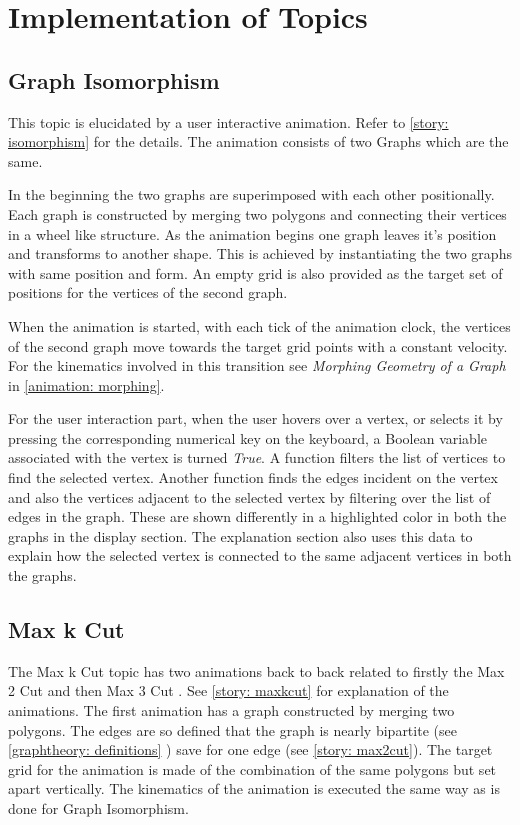 \section{Implementation of Topics}

\subsection{Graph Isomorphism}
\label{impl: isomporphism}

This topic is elucidated by a user interactive animation. Refer to
\autoref{story: isomorphism} for the details. The animation consists of two
Graphs which are the same. 

In the beginning the two graphs are superimposed with each other positionally.
Each graph is constructed by merging two polygons and connecting their vertices
in a wheel like structure.
As the animation begins one graph leaves it's position and transforms to
another shape.  This is achieved by instantiating the two graphs with same
position and form. An empty grid is also provided as the target set of
positions for the vertices of the second graph. 

When the animation is started, with each tick of the animation clock, the
vertices of the second graph move towards the target grid points with a
constant velocity. For the kinematics involved in this transition see
\emph{Morphing Geometry of a Graph} in \autoref{animation: morphing}.

For the user interaction part, when the user hovers over a vertex, or selects
it by pressing the corresponding numerical key on the keyboard, a Boolean
variable associated with the vertex is turned \emph{True}. A function filters
the list of vertices to find the selected vertex. Another function finds the
edges incident on the vertex and also the vertices adjacent to the selected
vertex by filtering over the list of edges in the graph. These are shown
differently in a highlighted color in both the graphs in the display section.
The explanation section also uses this data to explain how the selected vertex
is connected to the same adjacent vertices in both the graphs.

\subsection{Max k Cut}
\label{impl: maxkcut}
The Max k Cut topic has two animations back to back related to firstly the Max
2 Cut and then Max 3 Cut . See \autoref{story: maxkcut} for explanation of the
animations. The first animation has a graph constructed by merging two polygons.
The edges are so defined that the graph is nearly bipartite (see
\autoref{graphtheory: definitions} ) save for one edge (see \autoref{story:
max2cut}). The target grid for the animation is made of the combination of the
same polygons but set apart vertically. The kinematics of the animation is
executed the same way as is done for Graph Isomorphism.

